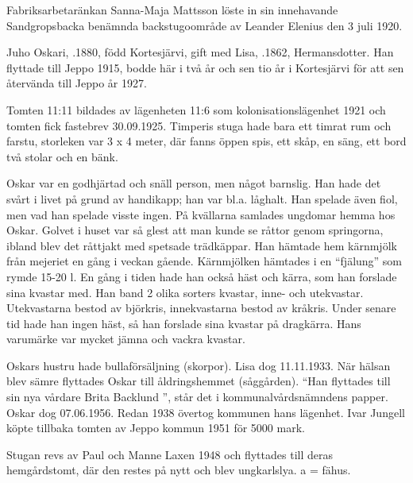 Fabriksarbetaränkan Sanna-Maja Mattsson löste in sin innehavande Sandgropsbacka benämnda backstugoområde av Leander Elenius den 3 juli 1920.\jhvspace{}




Juho Oskari, .1880, född Kortesjärvi, gift med Lisa, .1862, Hermansdotter. Han flyttade till Jeppo 1915, bodde här i två år och sen tio år i Kortesjärvi för att sen återvända till Jeppo år 1927.

Tomten 11:11 bildades av lägenheten 11:6 som kolonisationslägenhet 1921 och tomten fick fastebrev 30.09.1925. Timperis stuga hade bara ett timrat rum och farstu, storleken var 3 x 4 meter, där fanns öppen spis, ett skåp, en säng, ett bord två stolar och en bänk.

Oskar var en godhjärtad och snäll person, men något barnslig. Han hade det svårt i livet på grund av handikapp; han var bl.a. låghalt. Han spelade även fiol, men vad han spelade visste ingen. På kvällarna samlades ungdomar hemma hos Oskar. Golvet i huset var så glest att man kunde se råttor genom springorna, ibland blev det råttjakt med spetsade trädkäppar. Han hämtade hem kärnmjölk från mejeriet en gång i veckan gående. Kärnmjölken hämtades i en ``fjälung'' som rymde 15-20 l. En gång i tiden hade han också häst och kärra, som han forslade sina kvastar med. Han band 2 olika sorters kvastar, inne- och utekvastar. Utekvastarna bestod av björkris, innekvastarna  bestod av kråkris. Under senare tid hade han ingen häst, så han forslade sina kvastar på dragkärra. Hans varumärke var mycket jämna och vackra kvastar.

Oskars hustru hade bullaförsäljning (skorpor). Lisa dog 11.11.1933. När hälsan blev sämre flyttades Oskar till åldringshemmet (såggården). ``Han flyttades till sin nya vårdare Brita Backlund '', står det i kommunalvårdsnämndens papper. Oskar dog 07.06.1956. Redan 1938 övertog kommunen hans lägenhet. Ivar Jungell köpte tillbaka tomten av Jeppo kommun 1951 för 5000 mark.

Stugan revs av Paul och Manne Laxen 1948 och flyttades till deras hemgårdstomt, där den restes på nytt och blev ungkarlslya. a = fähus.





